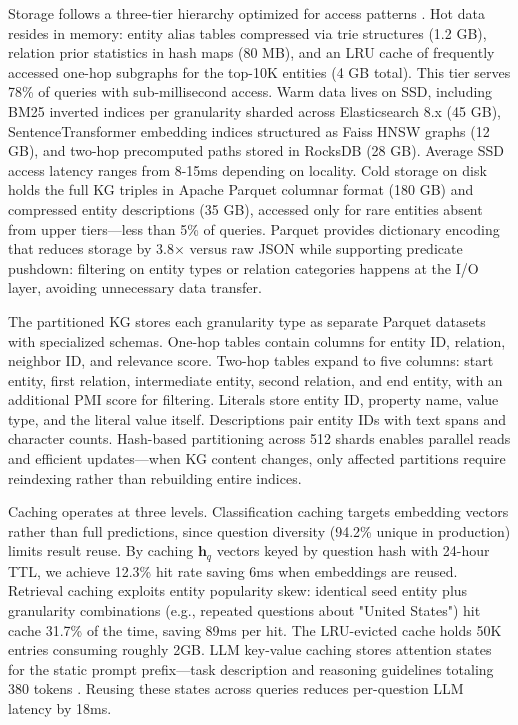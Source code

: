 \documentclass[conference]{IEEEtran}
\begin{document}
Storage follows a three-tier hierarchy optimized for access patterns \cite{dean2013tail}. Hot data resides in memory: entity alias tables compressed via trie structures (1.2 GB), relation prior statistics in hash maps (80 MB), and an LRU cache of frequently accessed one-hop subgraphs for the top-10K entities (4 GB total). This tier serves 78\% of queries with sub-millisecond access. Warm data lives on SSD, including BM25 inverted indices per granularity sharded across Elasticsearch 8.x (45 GB), SentenceTransformer embedding indices structured as Faiss HNSW graphs \cite{johnson2019faiss} (12 GB), and two-hop precomputed paths stored in RocksDB (28 GB). Average SSD access latency ranges from 8-15ms depending on locality. Cold storage on disk holds the full KG triples in Apache Parquet columnar format \cite{vohra2016apache} (180 GB) and compressed entity descriptions (35 GB), accessed only for rare entities absent from upper tiers—less than 5\% of queries. Parquet provides dictionary encoding that reduces storage by 3.8× versus raw JSON while supporting predicate pushdown: filtering on entity types or relation categories happens at the I/O layer, avoiding unnecessary data transfer.

The partitioned KG stores each granularity type as separate Parquet datasets with specialized schemas. One-hop tables contain columns for entity ID, relation, neighbor ID, and relevance score. Two-hop tables expand to five columns: start entity, first relation, intermediate entity, second relation, and end entity, with an additional PMI score for filtering. Literals store entity ID, property name, value type, and the literal value itself. Descriptions pair entity IDs with text spans and character counts. Hash-based partitioning across 512 shards enables parallel reads and efficient updates—when KG content changes, only affected partitions require reindexing rather than rebuilding entire indices.

Caching operates at three levels. Classification caching targets embedding vectors rather than full predictions, since question diversity (94.2\% unique in production) limits result reuse. By caching $\mathbf{h}_q$ vectors keyed by question hash with 24-hour TTL, we achieve 12.3\% hit rate saving 6ms when embeddings are reused. Retrieval caching exploits entity popularity skew: identical seed entity plus granularity combinations (e.g., repeated questions about "United States") hit cache 31.7\% of the time, saving 89ms per hit. The LRU-evicted cache holds 50K entries consuming roughly 2GB. LLM key-value caching stores attention states for the static prompt prefix—task description and reasoning guidelines totaling 380 tokens \cite{pope2022kvcache}. Reusing these states across queries reduces per-question LLM latency by 18ms.
\end{document}
